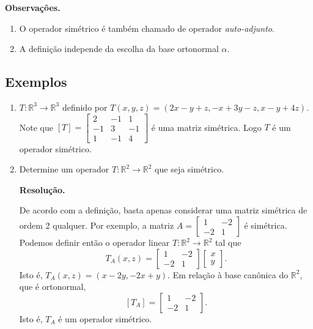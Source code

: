 \vspace{0.7cm}
\noindent \textbf{Observações.}

\begin{enumerate}
\item   O operador simétrico é também chamado de operador \textit{ auto-adjunto}.

\item   A definição independe da escolha da base ortonormal $\alpha$.
\end{enumerate}

\subsection{Exemplos}
\begin{enumerate}

\item $T: \mathbb{R}^3 \rightarrow \mathbb{R}^3$ definido por $T(x,y,z)=( 2x-y+z, -x+3y-z, x-y+4z)$. Note que
 $[T]= \left[ \begin{array}{ccc}2 &-1 & 1\\ -1 & 3& -1 \\ 1 & - 1& 4  \end{array} \right]$ é uma matriz simétrica. Logo $T$ é um operador simétrico.

 \item Determine um operador $T: \mathbb{R}^2 \rightarrow \mathbb{R}^2$ que seja simétrico.

\noindent \textbf{Resolução.}

De acordo com a definição, basta apenas considerar uma matriz simétrica  de ordem 2 qualquer. Por exemplo,  a  matriz $A=\left[ \begin{array}{cc} 1 &-2\\-2& 1  \end{array} \right]$  é simétrica. Podemos definir então o operador linear  $T: \mathbb{R}^2 \rightarrow \mathbb{R}^2$ tal que $$T_A(x,z)=\left[ \begin{array}{cc} 1 &-2\\-2& 1  \end{array} \right]\left[ \begin{array}{c} x \\y  \end{array} \right].$$ Isto é, $T_A(x,z)=(x-2y, -2x+y)$. Em relação à base canônica do $\mathbb{R}^2 $, que é ortonormal, $$[T_A]=\left[ \begin{array}{cc} 1 &-2\\-2& 1  \end{array} \right].$$ Isto é, $T_A$ é um operador simétrico.
\end{enumerate}

